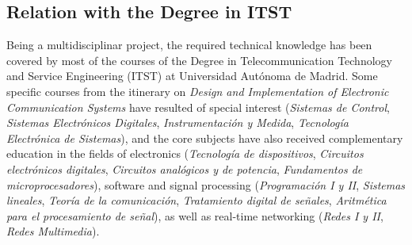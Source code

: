 \vspace{0.0001cm}







\subsection{Relation with the Degree in ITST}
Being a multidisciplinar project, the required technical knowledge has been covered by most of the courses of the Degree in Telecommunication Technology and Service Engineering (ITST) at Universidad Aut\'{o}noma de Madrid.
Some specific courses from the itinerary on \emph{Design and Implementation of Electronic Communication Systems} have resulted of special interest (\emph{Sistemas de Control}, \emph{Sistemas Electr\'{o}nicos Digitales}, \emph{Instrumentaci\'{o}n y Medida}, \emph{Tecnolog\'{i}a Electr\'{o}nica de Sistemas}), and the core subjects have also received complementary education in the fields of electronics (\emph{Tecnolog\'{i}a de dispositivos}, \emph{Circuitos electr\'{o}nicos digitales}, \emph{Circuitos anal\'{o}gicos y de potencia}, \emph{Fundamentos de microprocesadores}), software and signal processing (\emph{Programaci\'{o}n I y II}, \emph{Sistemas lineales}, \emph{Teor\'{i}a de la comunicaci\'{o}n}, \emph{Tratamiento digital de se\~{n}ales}, \emph{Aritm\'{e}tica para el procesamiento de se\~{n}al}), as well as real-time networking (\emph{Redes I y II}, \emph{Redes Multimedia}).





\singlespacing
